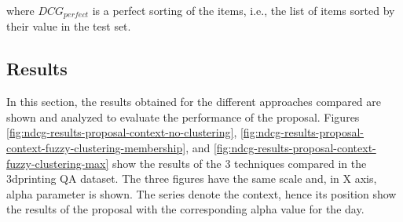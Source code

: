 \documentclass[preprint]{elsarticle}
\begin{document}
\begin{spacing}{1.5}
\noindent where $DCG_{perfect}$ is a perfect sorting of the items, i.e., the list of items sorted by their value in the test set.

\subsection{Results}

In this section, the results obtained for the different approaches compared are shown and analyzed to evaluate the performance of the proposal. Figures \ref{fig:ndcg-results-proposal-context-no-clustering}, \ref{fig:ndcg-results-proposal-context-fuzzy-clustering-membership}, and \ref{fig:ndcg-results-proposal-context-fuzzy-clustering-max} show the results of the 3 techniques compared in the 3dprinting QA dataset. The three figures have the same scale and, in X axis, alpha parameter is shown. The series denote the context, hence its position show the results of the proposal with the corresponding alpha value for the day.


\end{spacing}
\end{document}
